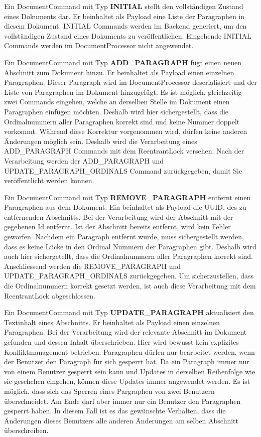 Ein DocumentCommand mit Typ \textbf{INITIAL} stellt den vollständigen Zustand eines Dokuments dar.
Er beinhaltet als Payload eine Liste der Paragraphen in diesem Dokument.
INITIAL Commands werden im Backend generiert, um den vollständigen Zustand eines Dokuments zu veröffentlichen.
Eingehende INITIAL Commands werden im DocumentProcessor nicht angewendet.

Ein DocumentCommand mit Typ \textbf{ADD\_PARAGRAPH} fügt einen neuen Abschnitt zum Dokument hinzu.
Er beinhaltet als Payload einen einzelnen Paragraphen.
Dieser Paragraph wird im DocumentProcessor deserialisiert und der Liste von Paragraphen im Dokument hinzugefügt.
Es ist möglich, gleichzeitig zwei Commands eingehen, welche an derselben Stelle im Dokument einen Paragraphen einfügen möchten.
Deshalb wird hier sichergestellt, dass die Ordinalnummern aller Paragraphen korrekt sind und keine Nummer doppelt vorkommt.
Während diese Korrektur vorgenommen wird, dürfen keine anderen Änderungen möglich sein.
Deshalb wird die Verarbeitung eines ADD\_PARAGRAPH Commands mit dem ReentrantLock versehen.
Nach der Verarbeitung werden der ADD\_PARAGRAPH und UPDATE\_PARAGRAPH\_ORDINALS Command zurückgegeben, damit Sie veröffentlicht werden können.

Ein DocumentCommand mit Typ \textbf{REMOVE\_PARAGRAPH} entfernt einen Paragraphen aus dem Dokument.
Ein beinhaltet als Payload die UUID, des zu entfernenden Abschnitts.
Bei der Verarbeitung wird der Abschnitt mit der gegebenen Id entfernt.
Ist der Abschnitt bereits entfernt, wird kein Fehler geworfen.
Nachdem ein Paragraph entfernt wurde, muss sichergestellt werden, dass es keine Lücke in den Ordinal Nummern der Paragraphen gibt.
Deshalb wird auch hier sichergetellt, dass die Ordinalnummern aller Paragraphen korrekt sind.
Anschliessend werden die REMOVE\_PARAGRAPH und UPDATE\_PARAGRAPH\_ORDINALS zurückgegeben.
Um sicherzustellen, dass die Ordinalnummern korrekt gesetzt werden, ist auch diese Verarbeitung mit dem ReentrantLock abgeschlossen.

Ein DocumentCommand mit Typ \textbf{UPDATE\_PARAGRAPH} aktualisiert den Textinhalt eines Abschnitts.
Er beinhaltet als Payload einen einzelnen Paragraphen.
Bei der Verarbeitung wird der relevante Abschnitt im Dokument gefunden und dessen Inhalt überschrieben.
Hier wird bewusst kein explizites Konfliktmanagement betrieben.
Paragraphen dürfen nur bearbeitet werden, wenn der Benutzer den Paragraph für sich gesperrt hat.
Da ein Paragraph immer nur von einem Benutzer gesperrt sein kann und Updates in derselben Reihenfolge wie sie geschehen eingehen, können diese Updates immer angewendet werden.
Es ist möglich, dass sich das Sperren eines Pargraphen von zwei Benutzern überschneidet.
Am Ende darf aber immer nur ein Benutzer den Paragraphen gesperrt haben.
In diesem Fall ist es das gewünschte Verhalten, dass die Änderungen dieses Benutzers alle anderen Änderungen am selben Abschnitt überschreiben. 

